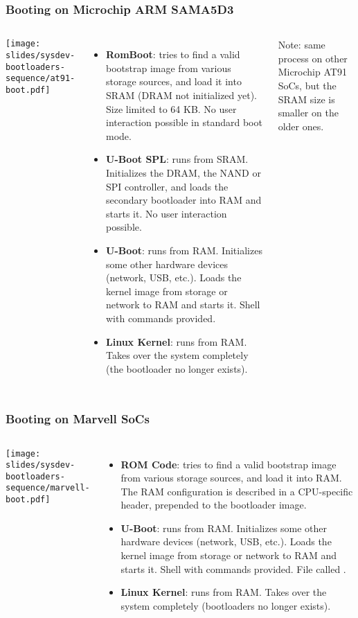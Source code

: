 \begin{frame}
  \frametitle{Booting on Microchip ARM SAMA5D3}
  \begin{columns}
    \texttt{[image: slides/sysdev-bootloaders-sequence/at91-boot.pdf]}
    \footnotesize
    \begin{itemize}
    \item {\bf RomBoot}: tries to find a valid bootstrap image from
      various storage sources, and load it into SRAM (DRAM not
      initialized yet). Size limited to 64 KB. No user interaction
      possible in standard boot mode.
    \item {\bf U-Boot SPL}: runs from SRAM. Initializes the DRAM,
      the NAND or SPI controller, and loads the secondary bootloader
      into RAM and starts it. No user interaction possible.
    \item {\bf U-Boot}: runs from RAM. Initializes some other hardware
      devices (network, USB, etc.).  Loads the kernel image from
      storage or network to RAM and starts it. Shell with commands
      provided.
    \item {\bf Linux Kernel}: runs from RAM. Takes over the system
      completely (the bootloader no longer exists).
    \end{itemize}
    Note: same process on other Microchip AT91 SoCs, but the
    SRAM size is smaller on the older ones.
  \end{columns}
\end{frame}

\begin{frame}
  \frametitle{Booting on Marvell SoCs}
  \begin{columns}
    \texttt{[image: slides/sysdev-bootloaders-sequence/marvell-boot.pdf]}
    \footnotesize
    \begin{itemize}
    \item {\bf ROM Code}: tries to find a valid bootstrap image from
      various storage sources, and load it into RAM. The RAM
      configuration is described in a CPU-specific header, prepended
      to the bootloader image.
    \item {\bf U-Boot}: runs from RAM. Initializes some other hardware
      devices (network, USB, etc.).  Loads the kernel image from
      storage or network to RAM and starts it. Shell with commands
      provided. File called .
    \item {\bf Linux Kernel}: runs from RAM. Takes over the system
      completely (bootloaders no longer exists).
    \end{itemize}
  \end{columns}
\end{frame}

